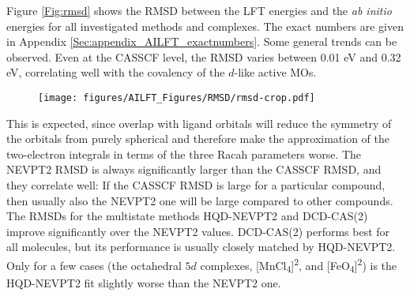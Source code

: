 Figure \ref{Fig:rmsd} shows the RMSD between the LFT energies and the \textit{ab initio} energies for all investigated methods and complexes. The exact numbers are given in Appendix \ref{Sec:appendix_AILFT_exactnumbers}. Some general trends can be observed. Even at the CASSCF level, the RMSD varies between 0.01 eV and 0.32 eV, correlating well with the covalency of the $d$-like active MOs. 
\begin{figure}
{\texttt{[image: figures/AILFT\_Figures/RMSD/rmsd-crop.pdf]}}
\end{figure}
This is expected, since overlap with ligand orbitals will reduce the symmetry of the orbitals from purely spherical and therefore make the approximation of the two-electron integrals in terms of the three Racah parameters worse. The NEVPT2 RMSD is always significantly larger than the CASSCF RMSD, and they correlate well: If the CASSCF RMSD is large for a particular compound, then usually also the NEVPT2 one will be large compared to other compounds. The RMSDs for the multistate methods HQD-NEVPT2 and DCD-CAS(2) improve significantly over the NEVPT2 values. DCD-CAS(2) performs best for all molecules, but its performance is usually closely matched by HQD-NEVPT2. Only for a few cases (the octahedral $5d$ complexes, [MnCl\textsubscript{4}]\textsuperscript{2\textminus}, and [FeO\textsubscript{4}]\textsuperscript{2\textminus}) is the HQD-NEVPT2 fit slightly worse than the NEVPT2 one.

